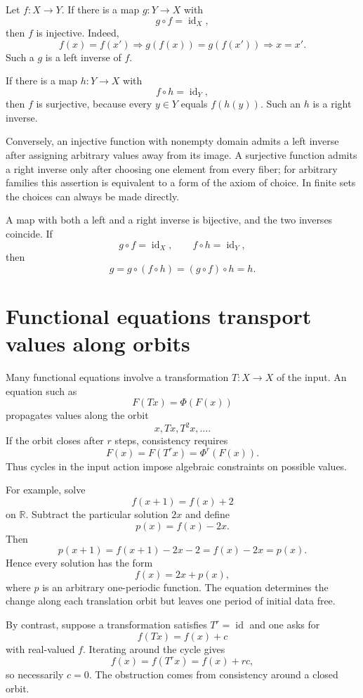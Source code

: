 Let \(f:X\to Y\).  If there is a map \(g:Y\to X\) with
\[
  g\circ f=\operatorname{id}_X,
\]
then \(f\) is injective.  Indeed,
\[
  f(x)=f(x')
  \Longrightarrow
  g(f(x))=g(f(x'))
  \Longrightarrow
  x=x'.
\]
Such a \(g\) is a left inverse of \(f\).

If there is a map \(h:Y\to X\) with
\[
  f\circ h=\operatorname{id}_Y,
\]
then \(f\) is surjective, because every \(y\in Y\) equals \(f(h(y))\).  Such an \(h\) is a right inverse.

Conversely, an injective function with nonempty domain admits a left inverse after assigning arbitrary values away from its image.  A surjective function admits a right inverse only after choosing one element from every fiber; for arbitrary families this assertion is equivalent to a form of the axiom of choice.  In finite sets the choices can always be made directly.

A map with both a left and a right inverse is bijective, and the two inverses coincide.  If
\[
  g\circ f=\operatorname{id}_X,
  \qquad
  f\circ h=\operatorname{id}_Y,
\]
then
\[
  g=g\circ(f\circ h)=(g\circ f)\circ h=h.
\]

\section{Functional equations transport values along orbits}

Many functional equations involve a transformation \(T:X\to X\) of the input.  An equation such as
\[
  F(Tx)=\Phi(F(x))
\]
propagates values along the orbit
\[
  x,Tx,T^2x,\ldots.
\]
If the orbit closes after \(r\) steps, consistency requires
\[
  F(x)=F(T^r x)=\Phi^r(F(x)).
\]
Thus cycles in the input action impose algebraic constraints on possible values.

For example, solve
\[
  f(x+1)=f(x)+2
\]
on \(\mathbb R\).  Subtract the particular solution \(2x\) and define
\[
  p(x)=f(x)-2x.
\]
Then
\[
  p(x+1)=f(x+1)-2x-2=f(x)-2x=p(x).
\]
Hence every solution has the form
\[
  \boxed{f(x)=2x+p(x),}
\]
where \(p\) is an arbitrary one-periodic function.  The equation determines the change along each translation orbit but leaves one period of initial data free.

By contrast, suppose a transformation satisfies \(T^r=\operatorname{id}\) and one asks for
\[
  f(Tx)=f(x)+c
\]
with real-valued \(f\).  Iterating around the cycle gives
\[
  f(x)=f(T^r x)=f(x)+rc,
\]
so necessarily \(c=0\).  The obstruction comes from consistency around a closed orbit.

